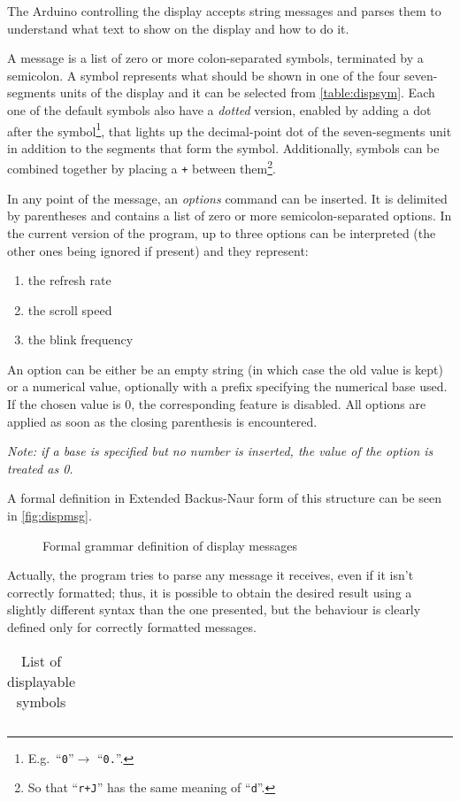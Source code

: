The Arduino controlling the display accepts string messages and parses them to
understand what text to show on the display and how to do it.

A message is a list of zero or more colon-separated symbols, terminated by a
semicolon.
A symbol represents what should be shown in one of the four seven-segments units
of the display and it can be selected from \autoref{table:dispsym}.
Each one of the default symbols also have a \emph{dotted} version, enabled by
adding a dot after the symbol\footnote{E.g.\ ``\Verb+0+''$\rightarrow$
``\Verb+0.+''.}, that lights up the decimal-point dot of the seven-segments unit
in addition to the segments that form the symbol.
Additionally, symbols can be combined together by placing a \Verb|+| between
them\footnote{So that ``\Verb|r+J|'' has the same meaning of ``\Verb|d|''.}.

\beforelist* In any point of the message, an \emph{options} command can be
inserted.
It is delimited by parentheses and contains a list of zero or more
semicolon-separated options.
In the current version of the program, up to three options can be interpreted
(the other ones being ignored if present) and they represent:
\begin{enumerate}
  \item the refresh rate
  \item the scroll speed
  \item the blink frequency
\end{enumerate}
\afterlist*
An option can be either be an empty string (in which case the old value is kept)
or a numerical value, optionally with a prefix specifying the numerical base
used.
If the chosen value is $0$, the corresponding feature is disabled.
All options are applied as soon as the closing parenthesis is encountered.

\emph{Note: if a base is specified but no number is inserted, the value of the
option is treated as 0.}

A formal definition in Extended Backus-Naur form\cite{ebnf} of this structure
can be seen in \autoref{fig:dispmsg}.

\begin{figure}[h]


\caption{Formal grammar definition of display messages}
\label{fig:dispmsg}
\end{figure}

Actually, the program tries to parse any message it receives, even if it isn't
correctly formatted; thus, it is possible to obtain the desired result using a
slightly different syntax than the one presented, but the behaviour is clearly
defined only for correctly formatted messages.

\begin{table}[h]
\begin{multicols}{6}
\makeatletter\col@number\@ne\makeatother
\begin{longtable}{l|c}
  
\end{longtable}
\end{multicols}

\caption{List of displayable symbols}
\label{table:dispsym}
\end{table}

